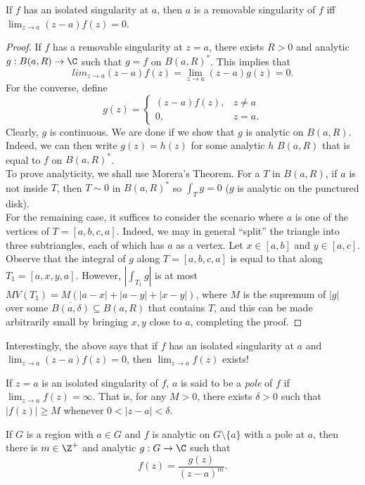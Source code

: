 		\begin{theorem}
			If $f$ has an isolated singularity at $a$, then $a$ is a removable singularity of $f$ iff $\lim_{z \to a} (z-a) f(z) = 0$.
		\end{theorem}
		\begin{proof}
			If $f$ has a removable singularity at $z = a$, there exists $R > 0$ and analytic $g : B(a,R) \to \C$ such that $g = f$ on $B(a,R)^*$. This implies that
			\[ lim_{z\to a} (z-a) f(z) = \lim_{z \to a} (z-a) g(z) = 0. \]
			For the converse, define
			\[ g(z) =
			\begin{cases}
				(z-a) f(z), & z \ne a \\
				0, & z=a.	
			\end{cases}
			\]
			Clearly, $g$ is continuous. We are done if we show that $g$ is analytic on $B(a,R)$. Indeed, we can then write $g(z) = h(z)$ for some analytic $h$ $B(a,R)$ that is equal to $f$ on $B(a,R)^*$.\\
			To prove analyticity, we shall use Morera's Theorem. For a $T$ in $B(a,R)$, if $a$ is not inside $T$, then $T \sim 0$ in $B(a,R)^*$ so $\int_T g = 0$ ($g$ is analytic on the punctured disk).\\
			For the remaining case, it suffices to consider the scenario where $a$ is one of the vertices of $T = [a,b,c,a]$. Indeed, we may in general ``split'' the triangle into three subtriangles, each of which has $a$ as a vertex. Let $x \in [a,b]$ and $y \in [a,c]$. Observe that the integral of $g$ along $T = [a,b,c,a]$ is equal to that along $T_1 = [a,x,y,a]$. However, $\left| \int_{T_1} g \right|$ is at most $M V(T_1) = M (|a-x| + |a-y| + |x-y|)$, where $M$ is the supremum of $|g|$ over some $\overline{B(a,\delta)} \subseteq B(a,R)$ that contains $T$, and this can be made arbitrarily small by bringing $x,y$ close to $a$, completing the proof.
		\end{proof}

		Interestingly, the above says that if $f$ has an isolated singularity at $a$ and $\lim_{z \to a} (z-a) f(z) = 0$, then $\lim_{z \to a} f(z)$ exists!

		\begin{fdef}[Pole]
			If $z = a$ is an isolated singularity of $f$, $a$ is said to be a \emph{pole} of $f$ if $\lim_{z \to a} f(z) = \infty$. That is, for any $M > 0$, there exists $\delta > 0$ such that $|f(z)| \ge M$ whenever $0 < |z-a| < \delta$.
		\end{fdef}

		\begin{prop}
			If $G$ is a region with $a \in G$ and $f$ is analytic on $G \setminus \{a\}$ with a pole at $a$, then there is $m \in \Z^+$ and analytic $g : G \to \C$ such that
			\[ f(z) = \frac{g(z)}{(z-a)^m}. \]
		\end{prop}